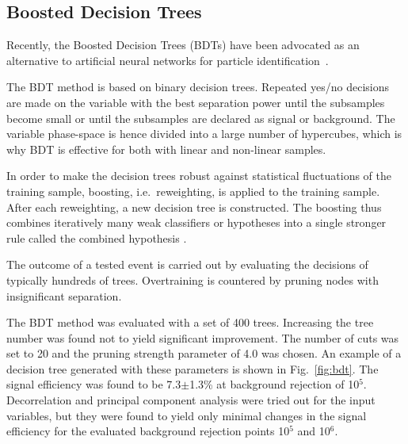 \documentclass[a4paper]{jpconf}
\begin{document}




\subsection{Boosted Decision Trees}
Recently, the Boosted Decision Trees (BDTs) have been advocated as an alternative to 
artificial neural networks for particle identification~\cite{bdt}.

The BDT method is based on binary decision trees. 
Repeated yes/no decisions are made on the variable with the
best separation power until the subsamples become small or until the
subsamples are declared as signal or background. The variable
phase-space is hence divided into a large number of hypercubes, which is
why BDT is effective for both with linear and non-linear
samples.

In order to make the decision trees robust against statistical
fluctuations of the training sample, boosting, i.e.~reweighting, is
applied to the training sample. After each reweighting, a new decision
tree is constructed. 
The boosting thus combines iteratively many weak classifiers or hypotheses 
into a single stronger rule called the combined hypothesis \cite{bdt}.

The outcome of a tested event is carried out
by evaluating the decisions of typically hundreds of
trees. Overtraining is countered by pruning nodes with insignificant
separation. 


The BDT method was evaluated with a set of 400 trees. Increasing the
tree number was found not to yield significant improvement. The number
of cuts was set to 20 and the pruning strength parameter of 4.0 was chosen. 
An example of a decision tree generated
with these parameters is shown in Fig.~\ref{fig:bdt}. The signal efficiency was
found to be 7.3$\pm$1.3\% at background rejection of 10$^5$.
Decorrelation and principal component analysis were tried out for the
input variables, but they were found to yield only minimal changes in
the signal efficiency for the evaluated background rejection points 10$^5$ and 10$^6$.
\end{document}
